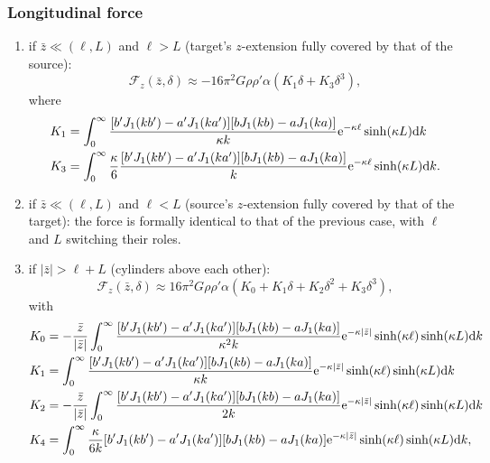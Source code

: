 \documentclass[12pt]{iopart}
\begin{document}
\subsubsection{Longitudinal force}

\begin{enumerate}
\item if $\bar{z}\ll(\ell,L)$ and $\ell > L$ (target's $z$-extension fully covered by that of the source):
\begin{equation} 
{\mathcal F}_z(\bar{z}, \delta) \approx -16\pi^2 G \rho \rho' \alpha (K_1 \delta + K_3 \delta^3),
\end{equation}
where
\begin{align}
K_1 &= \int_0^\infty \frac{[b'J_1(kb') - a'J_1(ka')] [bJ_1(kb) - aJ_1(ka)]}{\kappa k} {\rm e}^{-\kappa \ell} \sinh(\kappa L) {\rm d}k \\
K_3 &= \int_0^\infty \frac{\kappa}{6} \frac{[b'J_1(kb') - a'J_1(ka')] [bJ_1(kb) - aJ_1(ka)]}{k} {\rm e}^{-\kappa \ell} \sinh(\kappa L) {\rm d}k.
\end{align}

\item if $\bar{z}\ll(\ell,L)$ and $\ell < L$ (source's $z$-extension fully covered by that of the target): the force is formally identical to that of the previous case, with $\ell$ and $L$ switching their roles.

\item if $|\bar{z}| > \ell + L$ (cylinders above each other):
\begin{equation} 
{\mathcal F}_z(\bar{z}, \delta) \approx 16\pi^2 G \rho \rho' \alpha (K_0 + K_1 \delta + K_2 \delta^2 + K_3 \delta^3),
\end{equation}
with
\begin{align}
K_0 &= - \frac{\bar{z}}{|\bar{z}|} \int_0^\infty \frac{[b'J_1(kb') - a'J_1(ka')] [bJ_1(kb) - aJ_1(ka)]}{\kappa^2 k} {\rm e}^{-\kappa |\bar{z}|} \sinh(\kappa \ell) \sinh(\kappa L) {\rm d}k \\
K_1 &= \int_0^\infty \frac{[b'J_1(kb') - a'J_1(ka')] [bJ_1(kb) - aJ_1(ka)]}{\kappa k} {\rm e}^{-\kappa |\bar{z}|} \sinh(\kappa \ell) \sinh(\kappa L) {\rm d}k \\
K_2 &= - \frac{\bar{z}}{|\bar{z}|} \int_0^\infty \frac{[b'J_1(kb') - a'J_1(ka')] [bJ_1(kb) - aJ_1(ka)]}{2 k} {\rm e}^{-\kappa |\bar{z}|} \sinh(\kappa \ell) \sinh(\kappa L) {\rm d}k \\
K_4 &= \int_0^\infty \frac{\kappa}{6k} [b'J_1(kb') - a'J_1(ka')] [bJ_1(kb) - aJ_1(ka)] {\rm e}^{-\kappa |\bar{z}|} \sinh(\kappa \ell) \sinh(\kappa L) {\rm d}k,
\end{align}

\end{enumerate}
\end{document}
